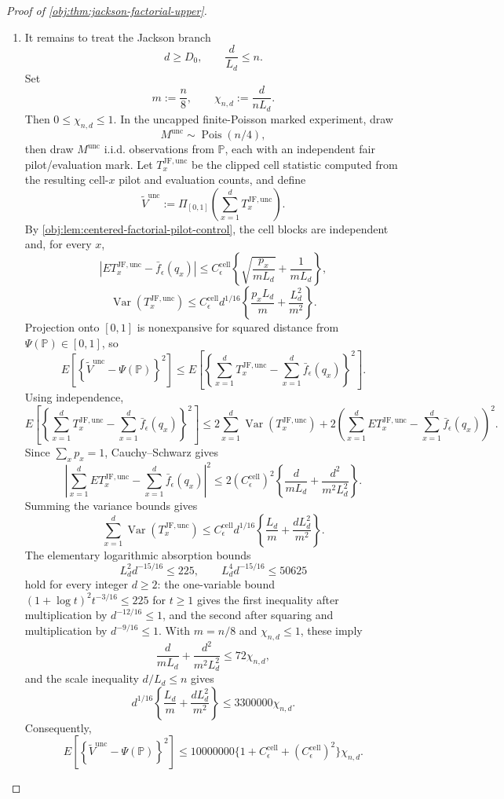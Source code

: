 \documentclass[11pt]{article}
\begin{document}
\begin{proof}[Proof of \cref{obj:thm:jackson-factorial-upper}]
\begin{enumerate}
\item It remains to treat the Jackson branch
\[
d\ge D_0,
\qquad
\frac{d}{L_d}\le n .
\]
Set
\[
m:=\frac n8,
\qquad
\chi_{n,d}:=\frac{d}{nL_d}.
\]
Then \(0\le\chi_{n,d}\le1\).  In the uncapped finite-Poisson marked
experiment, draw
\[
M^{\mathrm{unc}}\sim\operatorname{Pois}(n/4),
\]
then draw \(M^{\mathrm{unc}}\) i.i.d. observations from \(\mathbb P\), each
with an independent fair pilot/evaluation mark.  Let
\(T_x^{\mathrm{JF},\mathrm{unc}}\) be the clipped cell statistic computed from
the resulting cell-\(x\) pilot and evaluation counts, and define
\[
\widetilde V^{\mathrm{unc}}
:=
\Pi_{[0,1]}
\left(
\sum_{x=1}^d T_x^{\mathrm{JF},\mathrm{unc}}
\right).
\]
By \cref{obj:lem:centered-factorial-pilot-control}, the cell blocks are
independent and, for every \(x\),
\[
\left|
E T_x^{\mathrm{JF},\mathrm{unc}}-\bar f_\epsilon(q_x)
\right|
\le
C_{\epsilon}^{\mathrm{cell}}
\left\{
\sqrt{\frac{p_x}{mL_d}}+\frac{1}{mL_d}
\right\},
\]
\[
\operatorname{Var}(T_x^{\mathrm{JF},\mathrm{unc}})
\le
C_{\epsilon}^{\mathrm{cell}}d^{1/16}
\left\{
\frac{p_xL_d}{m}+\frac{L_d^2}{m^2}
\right\}.
\]
Projection onto \([0,1]\) is nonexpansive for squared distance from
\(\Psi(\mathbb P)\in[0,1]\), so
\[
E\left[
\left\{\widetilde V^{\mathrm{unc}}-\Psi(\mathbb P)\right\}^2
\right]
\le
E\left[
\left\{
\sum_{x=1}^dT_x^{\mathrm{JF},\mathrm{unc}}
-\sum_{x=1}^d\bar f_\epsilon(q_x)
\right\}^2
\right].
\]
Using independence,
\[
E\left[
\left\{
\sum_{x=1}^dT_x^{\mathrm{JF},\mathrm{unc}}
-\sum_{x=1}^d\bar f_\epsilon(q_x)
\right\}^2
\right]
\le
2\sum_{x=1}^d\operatorname{Var}(T_x^{\mathrm{JF},\mathrm{unc}})
+
2\left(
\sum_{x=1}^dET_x^{\mathrm{JF},\mathrm{unc}}
-\sum_{x=1}^d\bar f_\epsilon(q_x)
\right)^2 .
\]
Since \(\sum_x p_x=1\), Cauchy--Schwarz gives
\[
\left|
\sum_{x=1}^dET_x^{\mathrm{JF},\mathrm{unc}}
-\sum_{x=1}^d\bar f_\epsilon(q_x)
\right|^2
\le
2(C_{\epsilon}^{\mathrm{cell}})^2
\left\{
\frac{d}{mL_d}+\frac{d^2}{m^2L_d^2}
\right\}.
\]
Summing the variance bounds gives
\[
\sum_{x=1}^d\operatorname{Var}(T_x^{\mathrm{JF},\mathrm{unc}})
\le
C_{\epsilon}^{\mathrm{cell}}d^{1/16}
\left\{
\frac{L_d}{m}+\frac{dL_d^2}{m^2}
\right\}.
\]
The elementary logarithmic absorption bounds
\[
L_d^2d^{-15/16}\le225,
\qquad
L_d^4d^{-15/16}\le50625
\]
hold for every integer \(d\ge2\): the one-variable bound
\((1+\log t)^2t^{-3/16}\le225\) for \(t\ge1\) gives the first inequality after
multiplication by \(d^{-12/16}\le1\), and the second after squaring and
multiplication by \(d^{-9/16}\le1\).  With \(m=n/8\) and
\(\chi_{n,d}\le1\), these imply
\[
\frac{d}{mL_d}+\frac{d^2}{m^2L_d^2}
\le
72\chi_{n,d},
\]
and the scale inequality \(d/L_d\le n\) gives
\[
d^{1/16}
\left\{
\frac{L_d}{m}+\frac{dL_d^2}{m^2}
\right\}
\le
3300000\chi_{n,d}.
\]
Consequently,
\[
E\left[
\left\{\widetilde V^{\mathrm{unc}}-\Psi(\mathbb P)\right\}^2
\right]
\le
10000000
\{1+C_{\epsilon}^{\mathrm{cell}}+(C_{\epsilon}^{\mathrm{cell}})^2\}
\chi_{n,d}.
\]


\end{enumerate}
\end{proof}
\end{document}
